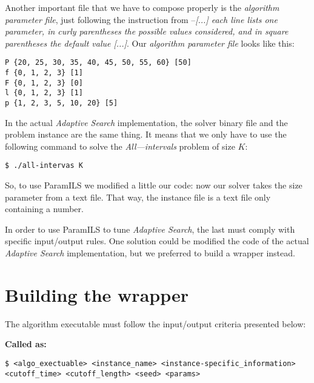 Another important file that we have to compose properly is the {\it algorithm parameter file}, just following the instruction from \cite{Hutter2008} --\textit{[...] each line lists one parameter, in curly parentheses the possible values considered, and in square parentheses the default value [...]}. Our {\it algorithm parameter file} looks like this:\\

\begin{shadedbox}
	\texttt{P \{20, 25, 30, 35, 40, 45, 50, 55, 60\} [50]\\
		f \{0, 1, 2, 3\} [1]\\
		F \{0, 1, 2, 3\} [0]\\
		l \{0, 1, 2, 3\} [1]\\
		p \{1, 2, 3, 5, 10, 20\} [5]
	}
\end{shadedbox}

In the actual {\it Adaptive Search} implementation, the solver binary file and the problem instance are the same thing. It means that we only have to use the following command to solve the {\it All---intervals} problem of size $K$: 

\begin{center}
	\texttt{\$ ./all-intervas K}
\end{center}

So, to use {\sc ParamILS} we modified a little our code: now our solver takes the size parameter from a text file. That way, the instance file is a text file only containing a number.

In order to use {\sc ParamILS} to tune {\it Adaptive Search}, the last must comply with specific input/output rules. One solution could be modified the code of the actual {\it Adaptive Search} implementation, but we preferred to build a wrapper instead.

\section{Building the wrapper}

The algorithm executable must follow the input/output criteria presented below: 

\textbf{\large Called as:} 

\begin{verbatim}
$ <algo_exectuable> <instance_name> <instance-specific_information> 
<cutoff_time> <cutoff_length> <seed> <params>
\end{verbatim}

